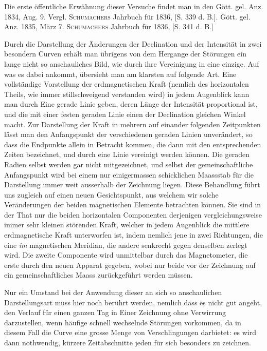 \expandafter\def\csname HistoricalNoteText376\endcsname{Die erste öffentliche Erwähnung dieser Versuche findet man in den Gött. gel. Anz. 1834, Aug. 9. Vergl. \textsc{Schumachers} Jahrbuch für 1836, [S. 339 d. B.].}
\expandafter\def\csname HistoricalNoteText376b\endcsname{Gött. gel. Anz. 1835, März 7. \textsc{Schumachers} Jahrbuch für 1836, [S. 341 d. B.]}
\par\clearpage
{}
Durch die Darstellung der Änderungen der Declination und der Intensität in zwei besondern Curven erhält man übrigens von dem Hergange der Störungen ein lange nicht so anschauliches Bild, wie durch ihre Vereinigung in eine einzige. Auf was es dabei ankommt, übersieht man am klarsten auf folgende Art. Eine vollständige Vorstellung der erdmagnetischen Kraft (nemlich des horizontalen Theils, wie immer stillschweigend verstanden wird) in jedem Augenblick kann man durch Eine gerade Linie geben, deren Länge der Intensität proportional ist, und die mit einer festen geraden Linie einen der Declination gleichen Winkel macht. Zur Darstellung der Kraft in mehrern auf einander folgenden Zeitpunkten lässt man den Anfangspunkt der verschiedenen geraden Linien unverändert, so dass die Endpunkte allein in Betracht kommen, die dann mit den entsprechenden Zeiten bezeichnet, und durch eine Linie vereinigt werden können. Die geraden Radien selbst werden gar nicht mitgezeichnet, und selbst der gemeinschaftliche Anfangspunkt wird bei einem nur einigermassen schicklichen Maassstab für die Darstellung immer weit ausserhalb der Zeichnung liegen. Diese Behandlung führt uns zugleich auf einen neuen Gesichtspunkt, aus welchem wir solche Veränderungen der beiden magnetischen Elemente betrachten können. Sie sind in der That nur die beiden horizontalen Componenten derjenigen vergleichungsweise immer sehr kleinen störenden Kraft, welcher in jedem Augenblick die mittlere erdmagnetische Kraft unterworfen ist, indem nemlich jene in zwei Richtungen, die eine \textit{im} magnetischen Meridian, die andere senkrecht gegen denselben zerlegt wird. Die zweite Componente wird unmittelbar durch das Magnetometer, die erste durch den neuen Apparat gegeben, wobei nur beide vor der Zeichnung auf ein gemeinschaftliches Maass zurückgeführt werden müssen.

Nur ein Umstand bei der Anwendung dieser an sich so anschaulichen Darstellungsart muss hier noch berührt werden, nemlich dass es nicht gut angeht, den Verlauf für einen ganzen Tag in Einer Zeichnung ohne Verwirrung darzustellen, wenn häufige schnell wechselnde Störungen vorkommen, da in diesem Fall die Curve eine grosse Menge von Verschlingungen darbietet: es wird dann nothwendig, kürzere Zeitabschnitte jeden für sich besonders zu zeichnen.

